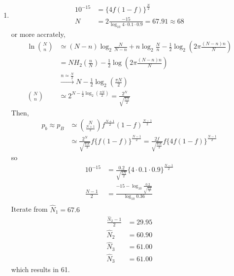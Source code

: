 \documentclass[12pt, a4paper]{article}
\begin{document}
\begin{sol}
\begin{enumerate}
\item[(d)]
\begin{align*}
    10^{-15} &= \{4f(1-f)\}^{\frac{N}{2}} \\
    N &= 2 \frac{-15}{\log_{10}4 \cdot 0.1 \cdot 0.9} = 67.91 \approx 68
\end{align*}
or more accrately,
\begin{align*}
    \ln \binom{N}{n} &\simeq (N-n) \log_2 \frac{N}{N-n} + n \log_2 \frac{N}{n} - \frac{1}{2} \log_2(2 \pi \frac{(N-n)n}{N}) \\
    &= NH_2(\frac{n}{N}) - \frac{1}{2} \log(2 \pi \frac{(N-n)n}{N}) \\
    &\xrightarrow{n \simeq \frac{N}{2}} N - \frac{1}{2} \log_2 (\frac{\pi N}{2}) \\[1em]
\binom{N}{n} &\simeq 2 ^ {N - \frac{1}{2} \log_2 (\frac{\pi N}{2})} = \frac{2^N}{\sqrt{\frac{\pi N}{2}}}
\end{align*}
Then, 
\begin{align*}
p_b \approx p_B &\simeq \binom{N}{\frac{N+1}{2}} f^{\frac{N+1}{2}} (1-f)^{\frac{N-1}{2}} \\
&\simeq \frac{2^N}{\sqrt{\frac{\pi N}{2}}} f \{f(1-f)\}^{\frac{N-1}{2}} = \frac{2f}{\sqrt{\frac{\pi N}{2}}} f \{4f(1-f)\}^{\frac{N-1}{2}}
\end{align*}
so
\begin{align*}
10^{-15} &= \frac{0.2}{\sqrt{\frac{\pi N}{2}}} \{4 \cdot 0.1 \cdot 0.9 \}^{\frac{N-1}{2}} \\
\frac{N-1}{2} &= \frac{-15-\log_10 \frac{0.2}{\sqrt{\frac{\pi N}{2}}}}{\log_10 0.36} \\
\end{align*}
Iterate from $\hat{N}_1 = 67.6$
\begin{align*}
    \frac{\hat{N}_2 - 1}{2} &= 29.95 \\
    \hat{N}_2 &= 60.90 \\
    \hat{N}_3 &= 61.00 \\
    \hat{N}_3 &= 61.00
\end{align*}
which results in 61.

\end{enumerate}
\end{sol}
\bigskip
\end{document}
